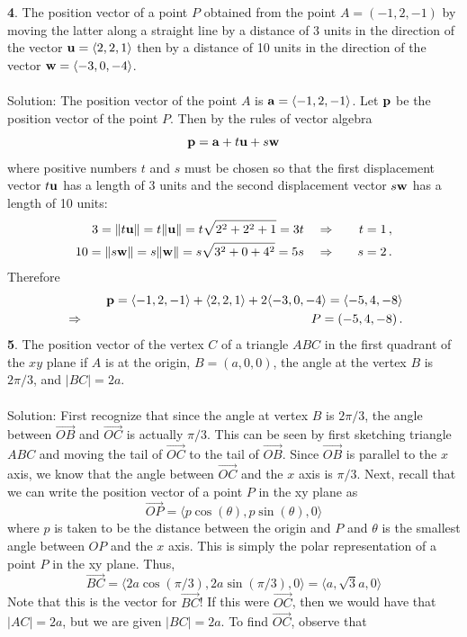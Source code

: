 \documentclass[12pt]{amsbook}
\newcommand{\la}{\langle}
\newcommand{\ra}{\rangle}
\begin{document}
{\small\bf 4}. The position vector of a point $P$
obtained from the point $A=(-1,2,-1)$ by moving the latter
along a straight line by a distance of 3 units in the direction of
the vector ${\bf u}=\la 2,2,1\ra$  then by a distance of 10 units
in the direction of
the vector ${\bf w}= \la -3,0,-4\ra$.
\\
\\
{\sc Solution}: The position vector of the point $A$ is 
${\bf a}=\la -1,2,-1\ra$. Let ${\bf p}$ be the position vector 
of the point $P$. Then by the rules of vector algebra
$$
{\bf p} = {\bf a}+t{\bf u}+s{\bf w}
$$
where positive numbers $t$ and $s$ must be chosen so that the first 
displacement vector $t{\bf u}$ has a length of 3 units and 
the second displacement vector $s{\bf w}$ has a length of 10 units:
\begin{eqnarray*}
3=\|t{\bf u}\|=t\|{\bf u}\|=t\sqrt{2^2+2^2+1}=3t 
\quad&\Rightarrow&\quad t=1\,,\\
10 = \|s{\bf w}\|=s\|{\bf w}\|=s\sqrt{3^2+0+4^2}=5s
\quad&\Rightarrow&\quad s=2\,.
\end{eqnarray*}
Therefore 
\begin{eqnarray*}
&&\quad{\bf p}=\la -1,2,-1\ra+\la 2,2,1\ra +2\la -3,0,-4\ra =\la -5,4,-8\ra\\
&
\Rightarrow&\quad P=(-5,4,-8)\,.
\end{eqnarray*}
{\small\bf 5}. The position vector of the vertex $C$ of a triangle
$ABC$ in the first quadrant of the $xy$ plane 
if $A$ is at the origin, $B=(a,0,0)$, the
angle at the vertex $B$ is $2\pi/3$, and $|BC|= 2a$.
\\
\\
{\sc Solution}: First recognize that since the angle at vertex $B$ is $2\pi/3$, the angle between $\overrightarrow{OB}$ and $\overrightarrow{OC}$ is actually $\pi/3$. This can be seen by first sketching triangle $ABC$ and moving the tail of $\overrightarrow{OC}$ to the tail of $\overrightarrow{OB}$. Since $\overrightarrow{OB}$ is parallel to the $x$ axis, we know that the angle between $\overrightarrow{OC}$ and the $x$ axis is $
\pi/3$. Next, recall that we can write the position vector of a point $P$ in the xy plane as 
$$\overrightarrow{OP}=\la p\cos(\theta), p\sin(\theta),0 \ra$$
where $p$ is taken to be the distance between the origin and $P$ and $\theta$ is the smallest angle between $OP$ and the $x$ axis. This is simply the polar representation of a point $P$ in the xy plane. Thus,
$$\overrightarrow{BC}=\la 2a\cos(\pi/3),2a\sin(\pi/3),0 \ra = \la a,\sqrt{3}a,0 \ra $$
Note that this is the vector for $\overrightarrow{BC}$! If this were $\overrightarrow{OC}$, then we would have that $|AC|=2a$, but we are given $|BC|=2a$. To find $\overrightarrow{OC}$, observe that
\end{document}
